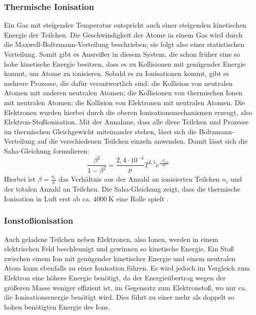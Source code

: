 \subsubsection{Thermische Ionisation}
\label{sec:thermion}
Ein Gas mit steigender Temperatur entspricht auch einer steigenden kinetischen Energie der Teilchen. Die Geschwindigkeit der Atome in einem Gas wird durch die Maxwell-Boltzmann-Verteilung beschrieben; sie folgt also einer statistischen Verteilung. Somit gibt es Ausreißer in diesem System, die schon früher eine so hohe kinetische Energie besitzen, dass es zu Kollisionen mit genügender Energie kommt, um Atome zu ionisieren. Sobald es zu Ionisationen kommt, gibt es mehrere Prozesse, die dafür verantwortlich sind: die Kollision von neutralen Atomen mit anderen neutralen Atomen; die Kollisionen von thermischen Ionen mit neutralen Atomen; die Kollision von Elektronen mit neutralen Atomen. Die Elektronen wurden hierbei durch die oberen Ionisationsmechanismen erzeugt, also Elektron-Stoßionisation. Mit der Annahme, dass alle diese Teilchen und Prozesse im thermischen Gleichgewicht miteinander stehen, lässt sich die Boltzmann-Verteilung auf die verschiedenen Teilchen einzeln anwenden. Damit lässt sich die Saha-Gleichung formulieren:
\begin{equation}
    \frac{\beta^2}{1 - \beta^2} = \frac{2,4 \cdot 10^{-4}}{p}T^{2,5}e^{\frac{-E_{ion}}{kT}}
    \label{eq:saha}
\end{equation}
Hierbei ist \(\beta = \frac{n_i}{n}\) das Verhältnis aus der Anzahl an ionisierten Teilchen \(n_i\) und der totalen Anzahl an Teilchen. Die Saha-Gleichung zeigt, dass die thermische Ionisation in Luft erst ab ca. \(\SI{4000}{\kelvin}\) eine Rolle spielt \cite{kuffel2000}.

\subsubsection{Ionstoßionisation}
Auch geladene Teilchen neben Elektronen, also Ionen, werden in einem elektrischen Feld beschleunigt und gewinnen so kinetische Energie. Ein Stoß zwischen einem Ion mit genügender kinetischer Energie und einem neutralen Atom kann ebenfalls zu einer Ionisation führen. Es wird jedoch im Vergleich zum Elektron eine höhere Energie benötigt, da der Energieübertrag wegen der größeren Masse weniger effizient ist, im Gegensatz zum Elektronstoß, wo nur ca. die Ionisationsenergie benötigt wird. Dies führt zu einer mehr als doppelt so hohen benötigten Energie des Ions.

